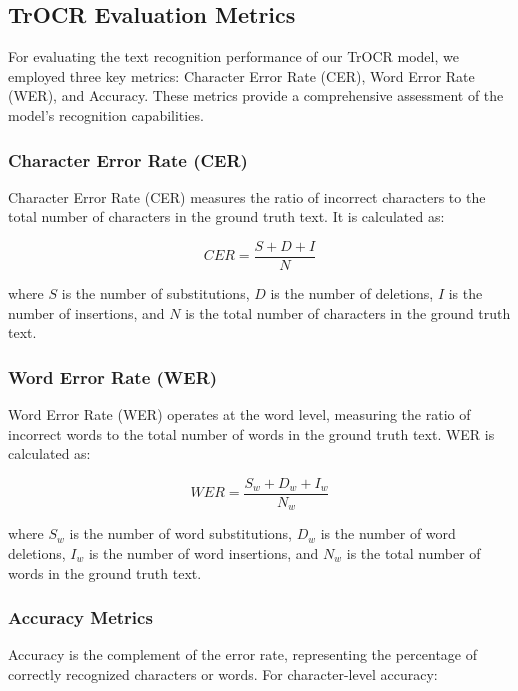\subsection{TrOCR Evaluation Metrics}
\label{subsec:trocr-evaluation}

For evaluating the text recognition performance of our TrOCR model, we employed three key metrics: Character Error Rate (CER), Word Error Rate (WER), and Accuracy. These metrics provide a comprehensive assessment of the model's recognition capabilities.

\subsubsection{Character Error Rate (CER)}
\label{subsubsec:cer-metric}

Character Error Rate (CER) measures the ratio of incorrect characters to the total number of characters in the ground truth text. It is calculated as:

\begin{equation}
    CER = \frac{S + D + I}{N}
\end{equation}

where $S$ is the number of substitutions, $D$ is the number of deletions, $I$ is the number of insertions, and $N$ is the total number of characters in the ground truth text.

\subsubsection{Word Error Rate (WER)}
\label{subsubsec:wer-metric}

Word Error Rate (WER) operates at the word level, measuring the ratio of incorrect words to the total number of words in the ground truth text. WER is calculated as:

\begin{equation}
    WER = \frac{S_w + D_w + I_w}{N_w}
\end{equation}

where $S_w$ is the number of word substitutions, $D_w$ is the number of word deletions, $I_w$ is the number of word insertions, and $N_w$ is the total number of words in the ground truth text.

\subsubsection{Accuracy Metrics}
\label{subsubsec:accuracy-metric}

Accuracy is the complement of the error rate, representing the percentage of correctly recognized characters or words. For character-level accuracy:

